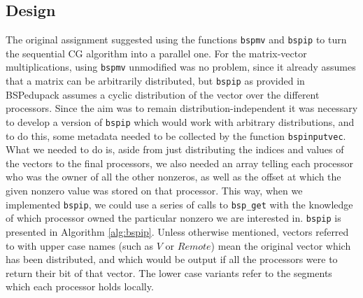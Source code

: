 \documentclass[a4paper]{article}
\begin{document}
\subsection{Design}

The original assignment suggested using the functions \texttt{bspmv} and \texttt{bspip}
to turn the sequential CG algorithm into a parallel one. For the matrix-vector multiplications,
using \texttt{bspmv} unmodified was no problem, since it already assumes that a matrix
can be arbitrarily distributed, but \texttt{bspip} as provided in BSPedupack
assumes a cyclic distribution of the vector over the different processors. Since the aim
was to remain distribution-independent it was necessary to develop a version of \texttt{bspip}
which would work with arbitrary distributions, and to do this, some metadata needed to be
collected by the function \texttt{bspinputvec}. What we needed to do is, aside from just distributing
the indices and values of the vectors to the final processors, we also needed an array
telling each processor who was the owner of all the other nonzeros, as well as the offset
at which the given nonzero value was stored on that processor. This way, when we implemented
\texttt{bspip}, we could use a series of calls to \texttt{bsp\_get} with the knowledge of which
processor owned the particular nonzero we are interested in.
\texttt{bspip} is presented in Algorithm \ref{alg:bspip}. Unless otherwise mentioned, vectors
referred to with upper case names (such as $V$ or $Remote$) mean the original vector which has been
distributed, and which would be output if all the processors were to return their bit of that vector.
The lower case variants refer to the segments which each processor holds locally.
\end{document}
